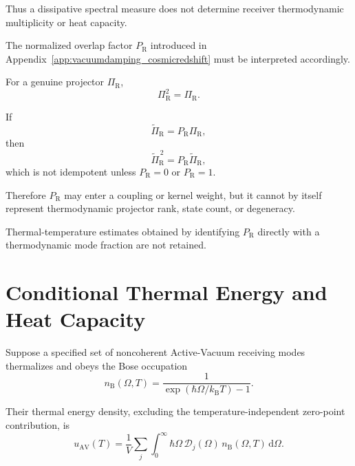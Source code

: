 Thus a dissipative spectral measure does not determine receiver
thermodynamic multiplicity or heat capacity.

The normalized overlap factor
\(P_{\mathrm R}\)
introduced in
Appendix~\ref{app:vacuumdamping_cosmicredshift}
must be interpreted accordingly.

For a genuine projector
\(\Pi_{\mathrm R}\),
\begin{equation}
    \Pi_{\mathrm R}^2
    =
    \Pi_{\mathrm R}.
\end{equation}

If
\begin{equation}
    \widetilde{\Pi}_{\mathrm R}
    =
    P_{\mathrm R}\Pi_{\mathrm R},
\end{equation}
then
\begin{equation}
    \widetilde{\Pi}_{\mathrm R}^{\,2}
    =
    P_{\mathrm R}
    \widetilde{\Pi}_{\mathrm R},
\end{equation}
which is not idempotent unless
\(P_{\mathrm R}=0\)
or
\(P_{\mathrm R}=1\).

Therefore
\(P_{\mathrm R}\)
may enter a coupling or kernel weight, but it cannot by itself represent
thermodynamic projector rank, state count, or degeneracy.

Thermal-temperature estimates obtained by identifying
\(P_{\mathrm R}\)
directly with a thermodynamic mode fraction are not retained.


\section{Conditional Thermal Energy and Heat Capacity}

Suppose a specified set of noncoherent Active-Vacuum receiving modes
thermalizes and obeys the Bose occupation
\begin{equation}
    n_{\mathrm B}(\Omega,T)
    =
    \frac{1}{
        \exp
        \left(
            \hbar\Omega/k_{\mathrm B}T
        \right)
        -1
    }.
    \label{eq:AT_Bose_occupation}
\end{equation}

Their thermal energy density, excluding the temperature-independent
zero-point contribution, is
\begin{equation}
    u_{\mathrm{AV}}(T)
    =
    \frac{1}{V}
    \sum_j
    \int_0^\infty
    \hbar\Omega\,
    \mathcal D_j(\Omega)\,
    n_{\mathrm B}(\Omega,T)
    \,\mathrm d\Omega.
    \label{eq:AT_thermal_energy_general}
\end{equation}

